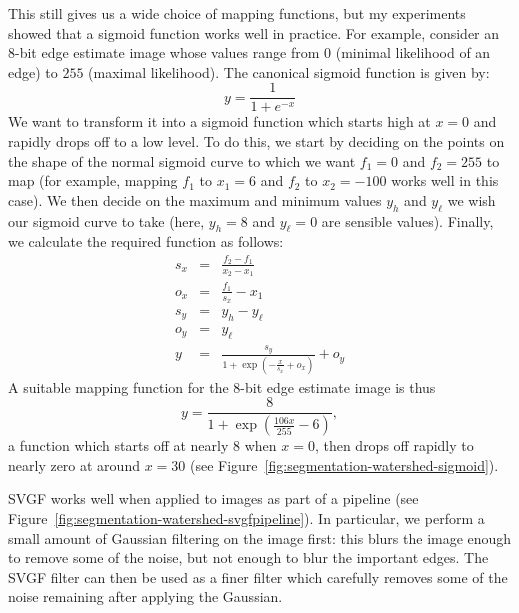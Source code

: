 This still gives us a wide choice of mapping functions, but my experiments showed that a sigmoid function works well in practice. For example, consider an 8-bit edge estimate image whose values range from $0$ (minimal likelihood of an edge) to $255$ (maximal likelihood). The canonical sigmoid function is given by:
%
\[
y = \frac{1}{1 + e^{-x}}
\]
%
We want to transform it into a sigmoid function which starts high at $x = 0$ and rapidly drops off to a low level. To do this, we start by deciding on the points on the shape of the normal sigmoid curve to which we want $f_1 = 0$ and $f_2 = 255$ to map (for example, mapping $f_1$ to $x_1 = 6$ and $f_2$ to $x_2 = -100$ works well in this case). We then decide on the maximum and minimum values $y_h$ and $y_\ell$ we wish our sigmoid curve to take (here, $y_h = 8$ and $y_\ell = 0$ are sensible values). Finally, we calculate the required function as follows:
%
\begin{eqnarray*}
s_x & = & \frac{f_2 - f_1}{x_2 - x_1} \\
o_x & = & \frac{f_1}{s_x} - x_1 \\
s_y & = & y_h - y_\ell \\
o_y & = & y_\ell \\
y & = & \frac{s_y}{1 + \exp(-\frac{x}{s_x} + o_x)} + o_y
\end{eqnarray*}
%
A suitable mapping function for the 8-bit edge estimate image is thus
%
\[
y = \frac{8}{1 + \exp(\frac{106x}{255} - 6)},
\]
%
a function which starts off at nearly $8$ when $x = 0$, then drops off rapidly to nearly zero at around $x = 30$ (see Figure~\ref{fig:segmentation-watershed-sigmoid}).


SVGF works well when applied to images as part of a pipeline (see Figure~\ref{fig:segmentation-watershed-svgfpipeline}). In particular, we perform a small amount of Gaussian filtering on the image first: this blurs the image enough to remove some of the noise, but not enough to blur the important edges. The SVGF filter can then be used as a finer filter which carefully removes some of the noise remaining after applying the Gaussian.


